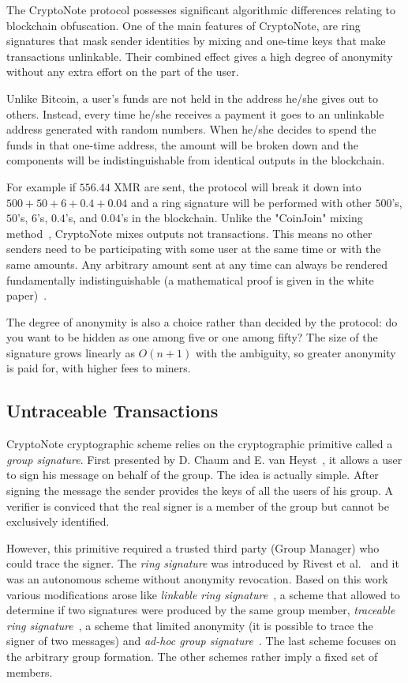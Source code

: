 The CryptoNote protocol possesses significant algorithmic differences relating to blockchain obfuscation. One of the main features of CryptoNote, are ring signatures that mask sender identities by mixing and one-time keys that make transactions unlinkable. Their combined effect gives a high degree of anonymity without any extra effort on the part of the user.

Unlike Bitcoin, a user's funds are not held in the address he/she gives out to others. Instead, every time he/she receives a payment it goes to an unlinkable address generated with random numbers. When he/she decides to spend the funds in that one-time address, the amount will be broken down and the components will be indistinguishable from identical outputs in the blockchain.

For example if $556.44$ XMR are sent, the protocol will break it down into $500 + 50 + 6 + 0.4 + 0.04$ and a ring signature will be performed with other $500$'s, $50$'s, $6$'s, $0.4$'s, and $0.04$'s in the blockchain. Unlike the "CoinJoin" mixing method~\cite{coinjoin}, CryptoNote mixes outputs not transactions. This means no other senders need to be participating with some user at the same time or with the same amounts. Any arbitrary amount sent at any time can always be rendered fundamentally indistinguishable (a mathematical proof is given in the white paper)~\cite{citeulike:14139412}.

The degree of anonymity is also a choice rather than decided by the protocol: do you want to be hidden as one among five or one among fifty? The size of the signature grows linearly as $O(n+1)$ with the ambiguity, so greater anonymity is paid for, with higher fees to miners.

\subsection{Untraceable Transactions}
CryptoNote cryptographic scheme relies on the cryptographic primitive called a \emph{group signature}. First presented by D. Chaum and E. van Heyst~\cite{group}, it allows a user to sign his message on behalf of the group. The idea is actually simple. After signing the message the sender provides the keys of all the users of his group. A verifier is conviced that the real signer is a member of the group but cannot be exclusively identified.

However, this primitive required a trusted third party (Group Manager) who could trace the signer. The \emph{ring signature} was introduced by Rivest et al.~\cite{ring} and it was an autonomous scheme without anonymity revocation. Based on this work various modifications arose like \emph{linkable ring signature}~\cite{link1,link2,short}, a scheme that allowed to determine if two signatures were produced by the same group member, \emph{traceable ring signature}~\cite{traceable1,traceable2}, a scheme that limited anonymity (it is possible to trace the signer of two messages) and \emph{ad-hoc group signature}~\cite{ad-hoc1,ad-hoc2}. The last scheme focuses on the arbitrary group formation. The other schemes rather imply a fixed set of members.

